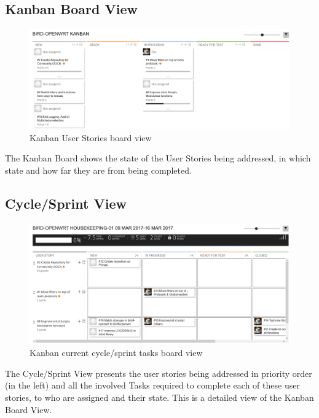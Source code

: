 \begin{appendices}
\begin{landscape}
\section{Kanban Board View}
\begin{figure}[ht!]
\centering
    \includegraphics[width=0.85\hsize]{images/kanban/kanban}
    \caption{Kanban User Stories board view}
    \label{fig:kboard}
\end{figure}
The Kanban Board shows the state of the User Stories being addressed, in which state and how far they are from being completed.
\newpage

\subsection{Cycle/Sprint View}
\begin{figure}[ht!]
\centering
    \includegraphics[width=0.85\hsize]{images/kanban/cycle}
    \caption{Kanban current cycle/sprint tasks board view}
    \label{fig:kcycle}
\end{figure}
The Cycle/Sprint View presents the user stories being addressed in priority order (in the left) and all the involved Tasks required to complete each of these user stories, to who are assigned and their state. This is a detailed view of the Kanban Board View.

\end{landscape}


\end{appendices}